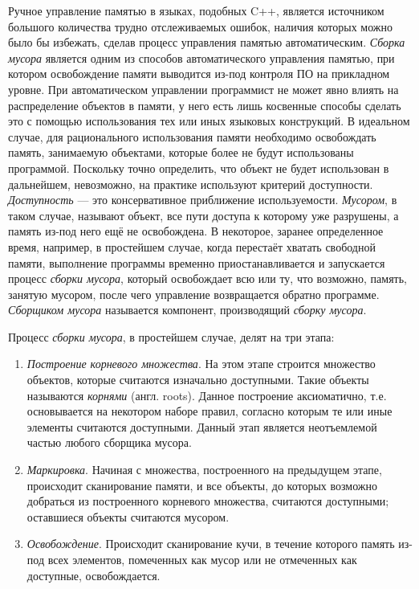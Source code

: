 Ручное управление памятью в языках, подобных C++, является источником большого количества трудно отслеживаемых ошибок, наличия которых можно было бы
избежать, сделав процесс управления памятью автоматическим. \textit{Сборка мусора} является одним из способов автоматического управления памятью, при
котором освобождение памяти выводится из-под контроля ПО на прикладном уровне. При автоматическом управлении программист не может явно влиять на распределение
объектов в памяти, у него есть лишь
косвенные способы сделать это с помощью использования тех или иных языковых конструкций. В идеальном случае, для рационального использования
памяти необходимо освобождать память, занимаемую объектами, которые более не будут использованы программой. Поскольку точно определить, что
объект не будет использован в дальнейшем, невозможно, на практике используют критерий доступности. \textit{Доступность} --- это консервативное
приближение используемости. \textit{Мусором}, в таком случае, называют объект, все пути доступа к которому уже разрушены, а память из-под него
ещё не освобождена. В некоторое, заранее определенное время, например, в простейшем случае, когда перестаёт хватать свободной памяти, выполнение
программы временно приостанавливается и запускается процесс \textit{сборки мусора}, который освобождает всю или ту, что возможно, память,
занятую мусором, после чего управление возвращается обратно программе. \textit{Сборщиком мусора} называется компонент, производящий \textit{сборку мусора}.

Процесс \textit{сборки мусора}, в простейшем случае, делят на три этапа:
\begin{enumerate}
\item \textit{Построение корневого множества}. На этом этапе строится множество объектов, которые считаются изначально доступными.
Такие объекты называются \textit{корнями} (англ. roots). Данное построение
аксиоматично, т.е. основывается на некотором наборе правил, согласно которым те или иные элементы считаются доступными. Данный этап является неотъемлемой
частью любого сборщика мусора.
\item \textit{Маркировка}. Начиная с множества, построенного на предыдущем этапе, происходит сканирование памяти, и все объекты, до которых возможно
добраться из построенного корневого множества, считаются доступными; оставшиеся объекты считаются мусором.
\item \textit{Освобождение}. Происходит сканирование кучи, в течение которого память из-под всех элементов, помеченных как мусор или не отмеченных как
доступные, освобождается.
\end{enumerate}

